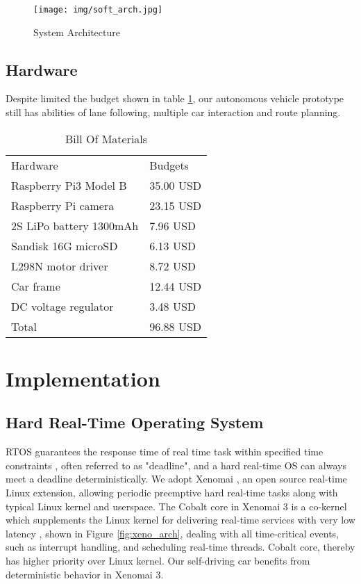 \documentclass[conference]{IEEEtran}
\begin{document}
\FloatBarrier

\begin{figure}
	\centering
	\texttt{[image: img/soft\_arch.jpg]}
	\caption{System Architecture}
	\label{fig:overall_arch}
\end{figure}

\subsection{Hardware}

Despite limited the budget shown in table \ref{hardware_list}, our autonomous vehicle prototype still has abilities of lane following, multiple car interaction and route planning.

\begin{table}
	\centering
	\caption{Bill Of Materials}
	\label{hardware_list}
	\begin{tabular}{ll}
		Hardware                & Budgets  \\
		Raspberry Pi3 Model B   & 35.00 USD \\
		Raspberry Pi camera     & 23.15 USD  \\
		2S LiPo battery 1300mAh & 7.96 USD  \\
		Sandisk 16G microSD     & 6.13 USD  \\
		L298N motor driver      & 8.72 USD  \\
		Car frame               & 12.44 USD  \\
		DC voltage regulator    &  3.48 USD  \\
		Total                   & 96.88 USD
	\end{tabular}
\end{table}

\section{Implementation}

\subsection{Hard Real-Time Operating System}

RTOS guarantees the response time of real time task within specified time constraints \cite{RTOS}, often referred to as "deadline", and a hard real-time OS can always meet a deadline deterministically. We adopt Xenomai \cite{Xenomai}, an open source real-time Linux extension, allowing periodic preemptive hard real-time tasks along with typical Linux kernel and userspace. The Cobalt core in Xenomai 3 is a co-kernel which supplements the Linux kernel for delivering real-time services with very low latency \cite{rtlws2015}, shown in Figure \ref{fig:xeno_arch}, dealing with all time-critical events, such as interrupt handling, and scheduling real-time threads. Cobalt core, thereby has higher priority over Linux kernel. Our self-driving car benefits from deterministic behavior in Xenomai 3.
\end{document}
